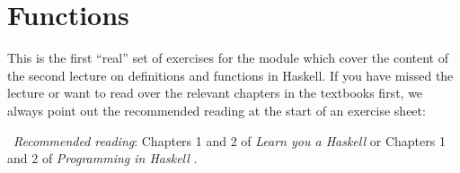 \section{Functions}

This is the first ``real'' set of exercises for the module which cover the content of the second lecture on definitions and functions in Haskell. If you have missed the lecture or want to read over the relevant chapters in the textbooks first, we always point out the recommended reading at the start of an exercise sheet:

\makebox[0.5cm]{\faBook}~\emph{Recommended reading}: Chapters 1 and 2 of \emph{Learn you a Haskell} \citep{lipovaca2011learn} or Chapters 1 and 2 of \emph{Programming in Haskell} \citep{hutton2016programming}.

